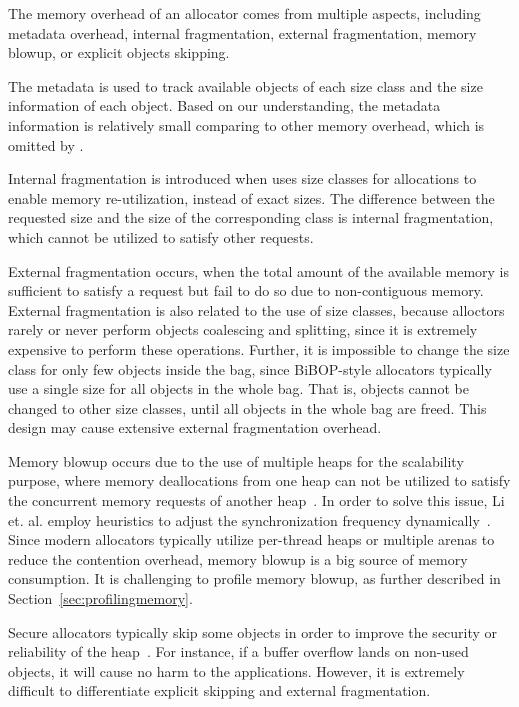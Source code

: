 The memory overhead of an allocator comes from multiple aspects, including metadata overhead, internal fragmentation, external fragmentation, memory blowup, or explicit objects skipping. 

The metadata is used to track available objects of each size class and the size information of each object. Based on our understanding, the metadata information is relatively small comparing to other memory overhead, which is omitted by \MP{}. 

Internal fragmentation is introduced when \MP{} uses size classes for allocations to enable memory re-utilization, instead of exact sizes. The difference between the requested size and the size of the corresponding class is internal fragmentation, which cannot be utilized to satisfy other requests. 

External fragmentation occurs, when the total amount of the available memory is sufficient to satisfy a request but fail to do so due to non-contiguous memory. External fragmentation is also related to the use of size classes, because alloctors rarely or never perform objects coalescing and splitting, since it is extremely expensive to perform these operations. Further, it is impossible to change the size class for only few objects inside the bag, since BiBOP-style allocators typically use a single size for all objects in the whole bag. That is, objects cannot be changed to other size classes, until all objects in the whole bag are freed. This design may cause extensive external fragmentation overhead. 

Memory blowup occurs due to the use of multiple heaps for the scalability purpose, where memory deallocations from one heap can not be utilized to satisfy the concurrent memory requests of another heap~\cite{Hoard}. In order to solve this issue, Li et. al. employ heuristics to adjust the synchronization frequency dynamically~\cite{DBLP:conf/iwmm/LiLD19}. Since modern allocators typically utilize per-thread heaps or multiple arenas to reduce the contention overhead,  memory blowup is a big source of memory consumption. It is challenging to profile memory blowup, as further described in Section~\ref{sec:profilingmemory}. 

Secure allocators typically skip some objects in order to improve the security or reliability of the heap~\cite{DieHarder, Guarder}. For instance, if a buffer overflow lands on non-used objects, it will cause no harm to the applications. However, it is extremely difficult to differentiate explicit skipping and external fragmentation. 


